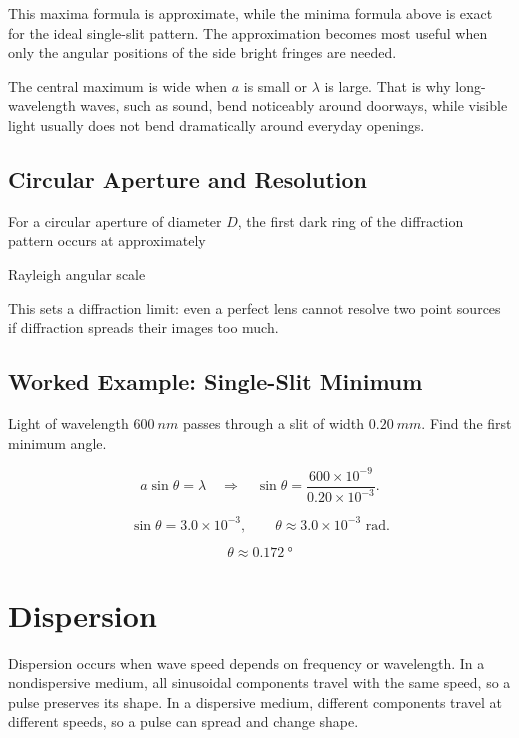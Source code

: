 \documentclass{studentnotes}
\begin{document}
This maxima formula is approximate, while the minima formula above is exact for
the ideal single-slit pattern. The approximation becomes most useful when only
the angular positions of the side bright fringes are needed.

The central maximum is wide when \(a\) is small or \(\lambda\) is large. That is
why long-wavelength waves, such as sound, bend noticeably around doorways, while
visible light usually does not bend dramatically around everyday openings.

\subsection{Circular Aperture and Resolution}

For a circular aperture of diameter \(D\), the first dark ring of the diffraction
pattern occurs at approximately

\begin{namedformula}{Rayleigh angular scale}
    \theta{}
\end{namedformula}

This sets a diffraction limit: even a perfect lens cannot resolve two point
sources if diffraction spreads their images too much.

\subsection{Worked Example: Single-Slit Minimum}

Light of wavelength \(\SI{600}{nm}\) passes through a slit of width
\(\SI{0.20}{mm}\). Find the first minimum angle.

\[
    a\sin\theta=\lambda
    \quad\Longrightarrow\quad
    \sin\theta=\frac{600\times10^{-9}}{0.20\times10^{-3}}.
\]

\[
    \sin\theta=3.0\times10^{-3},
    \qquad
    \theta\approx3.0\times10^{-3}\text{ rad}.
\]

\[
    \boxed{\theta\approx\SI{0.172}{\degree}}
\]

\section{Dispersion}

Dispersion occurs when wave speed depends on frequency or wavelength. In a
nondispersive medium, all sinusoidal components travel with the same speed, so a
pulse preserves its shape. In a dispersive medium, different components travel at
different speeds, so a pulse can spread and change shape.
\end{document}
